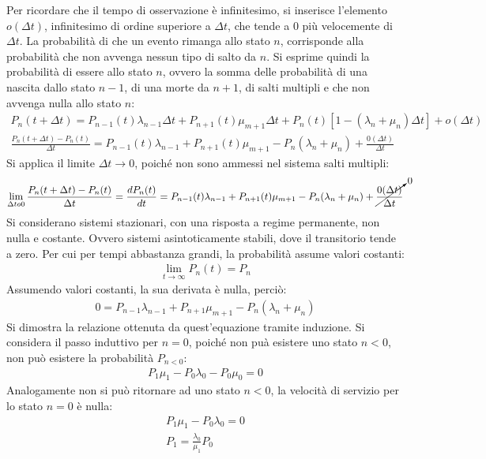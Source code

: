 \documentclass{article}
\numberwithin{equation}{subsection}
\begin{document}
Per ricordare che il tempo di osservazione è infinitesimo, si inserisce l'elemento $o(\Delta t)$, infinitesimo di ordine superiore a $\Delta t$, che tende a $0$ più 
velocemente di $\Delta t$. La probabilità di che un evento rimanga allo stato $n$, corrisponde alla probabilità che non avvenga nessun tipo di salto da $n$. Si 
esprime quindi la probabilità di essere allo stato $n$, ovvero la somma delle probabilità di una nascita dallo stato $n-1$, di una morte da $n+1$, di salti multipli e che 
non avvenga nulla allo stato $n$:
\begin{gather*}
    P_n(t+\Delta t)=P_{n-1}(t)\lambda_{n-1}\Delta t+P_{n+1}(t)\mu_{m+1}\Delta t+P_n(t)[1-(\lambda_n+\mu_n)\Delta t]+o(\Delta t)\\
    \displaystyle\frac{P_n(t+\Delta t)-P_n(t)}{\Delta t}=P_{n-1}(t)\lambda_{n-1}+P_{n+1}(t)\mu_{m+1}-P_n(\lambda_n+\mu_n)+\frac{0(\Delta t)}{\Delta t}
\end{gather*}
Si applica il limite $\Delta t\to0$, poiché non sono ammessi nel sistema salti multipli: 
\begin{gather*}
    \lim_{\Delta to0}\displaystyle\displaystyle\frac{P_n(t+\Delta t)-P_n(t)}{\Delta t}=\frac{dP_n(t)}{dt}=P_{n-1}(t)\lambda_{n-1}+P_{n+1}(t)\mu_{m+1}-P_n(\lambda_n+\mu_n)+\cancelto{0}{\frac{0(\Delta t)}{\Delta t}}
\end{gather*}
Si considerano sistemi stazionari, con una risposta a regime permanente, non nulla e costante. Ovvero sistemi asintoticamente stabili, dove il transitorio tende a zero. 
Per cui per tempi abbastanza grandi, la probabilità assume valori costanti:
\begin{gather*}
    \displaystyle\lim_{t\to\infty}P_n(t)=P_n
\end{gather*}
Assumendo valori costanti, la sua derivata è nulla, perciò:
\begin{gather*}
    0=P_{n-1}\lambda_{n-1}+P_{n+1}\mu_{m+1}-P_n(\lambda_n+\mu_n)
\end{gather*}
Si dimostra la relazione ottenuta da quest'equazione tramite induzione. Si considera il passo induttivo per $n=0$, poiché non puà esistere uno stato $n<0$, non può esistere 
la probabilità $P_{n<0}$:
\begin{gather*}
    P_1\mu_1-P_0\lambda_0-P_0\mu_0=0
\end{gather*}
Analogamente non si può ritornare ad uno stato $n<0$, la velocità di servizio per lo stato $n=0$ è nulla:
\begin{gather*}
    P_1\mu_1-P_0\lambda_0=0\\
    P_1=\displaystyle\frac{\lambda_0}{\mu_1}P_0
\end{gather*}
\end{document}
